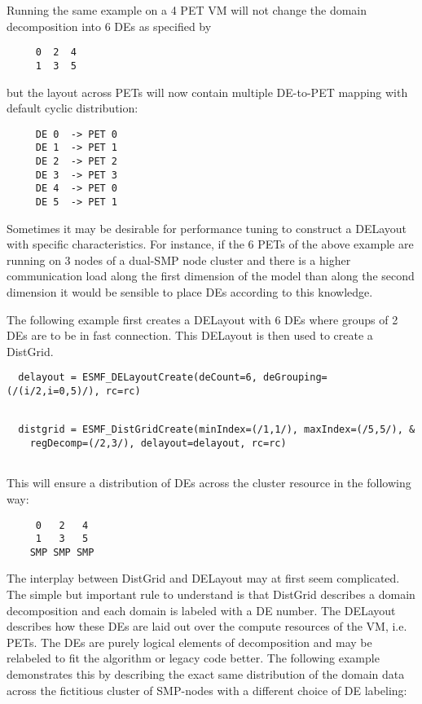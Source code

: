    Running the same example on a 4 PET VM will not change the domain 
   decomposition into 6 DEs as specified by
   \begin{verbatim}
     0  2  4
     1  3  5
   \end{verbatim}
   but the layout across PETs will now contain multiple DE-to-PET mapping with 
   default cyclic distribution:
   \begin{verbatim}
     DE 0  -> PET 0
     DE 1  -> PET 1
     DE 2  -> PET 2
     DE 3  -> PET 3
     DE 4  -> PET 0
     DE 5  -> PET 1
   \end{verbatim}
  
   Sometimes it may be desirable for performance tuning to construct a DELayout
   with specific characteristics. For instance, if the 6 PETs of the above 
   example are running on 3 nodes of a dual-SMP node cluster and there is a 
   higher communication load along the first dimension of the model than along 
   the second dimension it would be sensible to place DEs according to this 
   knowledge. 

   The following example first creates a DELayout 
   with 6 DEs where groups of 2 DEs are to be in fast connection. This DELayout 
   is then used to create a DistGrid. 

 \begin{verbatim}
  delayout = ESMF_DELayoutCreate(deCount=6, deGrouping=(/(i/2,i=0,5)/), rc=rc)
 
\end{verbatim}
 

 \begin{verbatim}
  distgrid = ESMF_DistGridCreate(minIndex=(/1,1/), maxIndex=(/5,5/), &
    regDecomp=(/2,3/), delayout=delayout, rc=rc)
 
\end{verbatim}
 

   This will ensure a distribution of DEs across the cluster resource 
   in the following way:
   \begin{verbatim}
     0   2   4
     1   3   5
    SMP SMP SMP
   \end{verbatim}
   
   The interplay between DistGrid and DELayout may at first seem complicated.
   The simple but important rule to understand is that DistGrid describes a 
   domain decomposition and each domain is labeled with a DE number. The DELayout
   describes how these DEs are laid out over the compute resources of the VM, 
   i.e. PETs. The DEs are purely logical elements of decomposition and may be 
   relabeled to fit the algorithm or legacy code better. The following 
   example demonstrates this by describing the exact same distribution of the 
   domain data across the fictitious cluster of SMP-nodes with a different 
   choice of DE labeling: 

